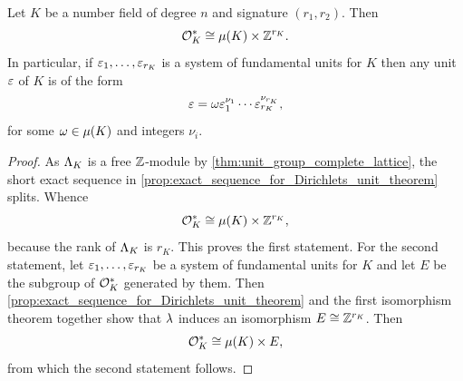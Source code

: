     \begin{theorem*}
      Let \(K\) be a number field of degree \(n\) and signature \((r_{1},r_{2})\). Then
      \[
        \mathcal{O}_{K}^{\ast} \cong \mu(K) \times \mathbb{Z}^{r_{K}}.
      \]
      In particular, if \(\varepsilon_{1},\ldots,\varepsilon_{r_{K}}\) is a system of fundamental units for \(K\) then any unit \(\varepsilon\) of \(K\) is of the form
      \[
        \varepsilon = \omega\varepsilon_{1}^{\nu_{1}} \cdots \varepsilon_{r_{K}}^{\nu_{r_{K}}},
      \]
      for some \(\omega \in \mu(K)\) and integers \(\nu_{i}\).
    \end{theorem*}
    \begin{proof}
      As \(\Lambda_{K}\) is a free \(\mathbb{Z}\)-module by \cref{thm:unit_group_complete_lattice}, the short exact sequence in \cref{prop:exact_sequence_for_Dirichlets_unit_theorem} splits. Whence
      \[
        \mathcal{O}_{K}^{\ast} \cong \mu(K) \times \mathbb{Z}^{r_{K}},
      \]
      because the rank of \(\Lambda_{K}\) is \(r_{K}\). This proves the first statement. For the second statement, let \(\varepsilon_{1},\ldots,\varepsilon_{r_{K}}\) be a system of fundamental units for \(K\) and let \(E\) be the subgroup of \(\mathcal{O}_{K}^{\ast}\) generated by them. Then \cref{prop:exact_sequence_for_Dirichlets_unit_theorem} and the first isomorphism theorem together show that \(\lambda\) induces an isomorphism \(E \cong \mathbb{Z}^{r_{K}}\). Then
      \[
        \mathcal{O}_{K}^{\ast} \cong \mu(K) \times E,
      \]
      from which the second statement follows.
    \end{proof}

